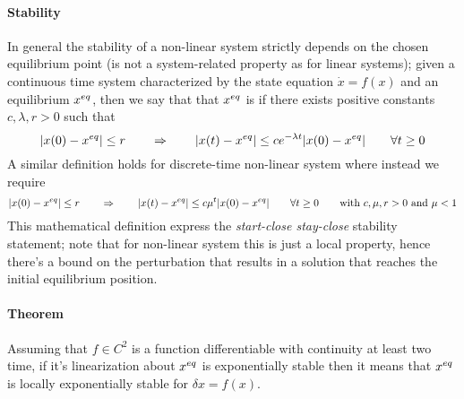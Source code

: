 		\paragraph{Stability} In general the stability of a non-linear system strictly depends on the chosen equilibrium point (is not a system-related property as for linear systems); given a continuous time system characterized by the state equation $\dot x = f(x)$ and an equilibrium $x^{eq}$, then we say that that $x^{eq}$ is  if there exists positive constants $c,\lambda,r>0$ such that
		\[ |x(0) - x^{eq}| \leq r \qquad \Rightarrow \qquad |x(t) - x^{eq}| \leq c e^{-\lambda t} |x(0) - x^{eq}| \qquad \forall t\geq 0 \]
		A similar definition holds for discrete-time non-linear system where instead we require
		\[ |x(0) - x^{eq}| \leq r \qquad \Rightarrow \qquad |x(t) - x^{eq}| \leq c \mu^t |x(0) - x^{eq}| \qquad \forall t\geq 0 \qquad \textrm{with } c,\mu,r>0 \textrm{ and } \mu  < 1 \]
		This mathematical definition express the \textit{start-close stay-close} stability statement; note that for non-linear system this is just a local property, hence there's a bound on the perturbation that results in a solution that reaches the initial equilibrium position.
	
		\paragraph{Theorem} Assuming that $f \in C^2$ is a function differentiable with continuity at least two time, if it's linearization about $x^{eq}$ is exponentially stable then it means that $x^{eq}$ is locally exponentially stable for $\delta x = f(x)$.
	
	
	
	
	
	
	
	
	
	
	
	
	
	
	
	
	
	
	
	
	
	
	
	
	
	